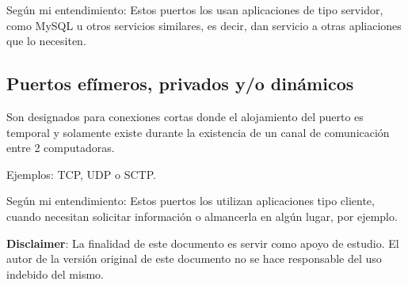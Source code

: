 \documentclass{article}
\begin{document}
Según mi entendimiento: Estos puertos los usan aplicaciones de tipo servidor, como
MySQL u otros servicios similares, es decir, dan servicio a otras apliaciones
que lo necesiten.

\subsection{Puertos efímeros, privados y/o dinámicos}

Son designados para conexiones cortas donde el alojamiento del puerto es temporal
y solamente existe durante la existencia de un canal de comunicación entre
2 computadoras.
\vspace{1em}

Ejemplos: TCP, UDP o SCTP.
\vspace{1em}

Según mi entendimiento: Estos puertos los utilizan aplicaciones tipo cliente,
cuando necesitan solicitar información o almancerla en algún lugar, por ejemplo.
\vspace{1em}

\textbf{Disclaimer}: La finalidad de este documento es servir como apoyo de estudio.
El autor de la versión original de este documento no se hace responsable del
uso indebido del mismo.
\end{document}
